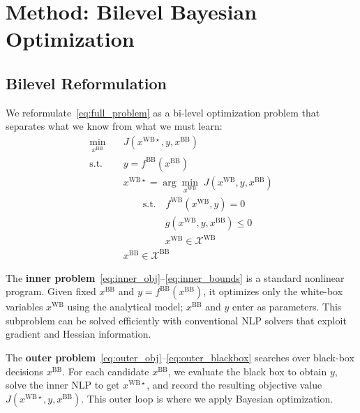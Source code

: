 \documentclass[12pt,a4paper]{article}%
\theoremstyle{plain}%
\theoremstyle{remark}%
\theoremstyle{definition}%
\def\WB{\mathrm{WB}}
\def\BB{\mathrm{BB}}
\begin{document}
\section{Method: Bilevel Bayesian Optimization}\label{sec:method}

\subsection{Bilevel Reformulation}\label{subsec:bilevel_reformulation}

We reformulate~\eqref{eq:full_problem} as a bi-level optimization problem that separates what we know from what we must learn:
\begin{subequations}\label{eq:bilevel}
\begin{align}
    \min_{x^{\BB}} \quad & J(x^{\WB\star}, y, x^{\BB}) \label{eq:outer_obj}\\
    \text{s.t.} \quad & y = f^{\BB}(x^{\BB}) \label{eq:outer_blackbox}\\
    & x^{\WB\star} = \arg\min_{x^{\WB}} \; J(x^{\WB}, y, x^{\BB}) \label{eq:inner_obj}\\
    & \quad\quad \text{s.t.} \quad f^{\WB}(x^{\WB}, y) = 0 \label{eq:inner_process}\\
    & \quad\quad\quad\quad\; g(x^{\WB}, y, x^{\BB}) \leq 0 \label{eq:inner_ineq}\\
    & \quad\quad\quad\quad\; x^{\WB} \in \mathcal{X}^{\WB} \label{eq:inner_bounds}\\
    & x^{\BB} \in \mathcal{X}^{\BB} \label{eq:outer_bounds}
\end{align}
\end{subequations}

The \textbf{inner problem}~\eqref{eq:inner_obj}--\eqref{eq:inner_bounds} is a standard nonlinear program. Given fixed $x^{\BB}$ and $y = f^{\BB}(x^{\BB})$, it optimizes only the white-box variables $x^{\WB}$ using the analytical model; $x^{\BB}$ and $y$ enter as parameters. This subproblem can be solved efficiently with conventional NLP solvers that exploit gradient and Hessian information.

The \textbf{outer problem}~\eqref{eq:outer_obj}--\eqref{eq:outer_blackbox} searches over black-box decisions $x^{\BB}$. For each candidate $x^{\BB}$, we evaluate the black box to obtain $y$, solve the inner NLP to get $x^{\WB\star}$, and record the resulting objective value $J(x^{\WB\star}, y, x^{\BB})$. This outer loop is where we apply Bayesian optimization.
\end{document}
